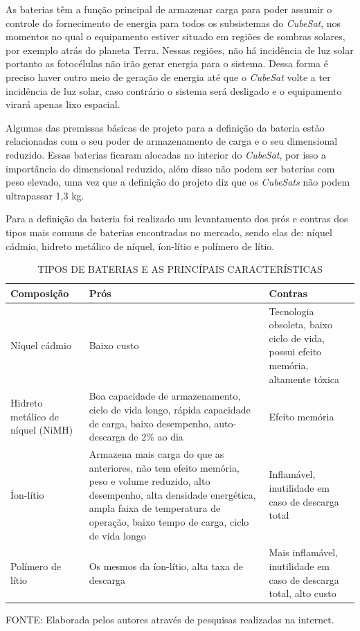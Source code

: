 \documentclass[
	12pt,				%
	openright,			%
	oneside,			%
	a4paper,			%
	english,			%
	french,				%
	spanish,			%
	brazil,				%
	oldfontcommands
	]{abntex2}
\begin{document}
	
	As baterias têm a função principal de armazenar carga para poder assumir o controle do fornecimento de energia para todos os subsistemas do \textit{CubeSat}, nos momentos no qual o equipamento estiver situado em regiões de sombras solares, por exemplo atrás do planeta Terra. Nessas regiões, não há incidência de luz solar portanto as fotocélulas não irão gerar energia para o sistema. Dessa forma é preciso haver outro meio de geração de energia até que o \textit{CubeSat} volte a ter incidência de luz solar, caso contrário o sistema será desligado e o equipamento virará apenas lixo espacial.	
	
	Algumas das premissas básicas de projeto para a definição da bateria estão relacionadas com o seu poder de armazenamento de carga e o seu dimensional reduzido. Essas baterias ficaram alocadas no interior do \textit{CubeSat}, por isso a importância do dimensional reduzido, além disso não podem ser baterias com peso elevado, uma vez que a definição do projeto diz que os \textit{CubeSats} não podem ultrapassar 1,3 kg.
	
	Para a definição da bateria foi realizado um levantamento dos prós e contras dos tipos mais comuns de baterias encontradas no mercado, sendo elas de: níquel cádmio, hidreto metálico de níquel, íon-lítio e polímero de lítio.
		
	\begin{table}[th]
	\caption{TIPOS DE BATERIAS E AS PRINCÍPAIS CARACTERÍSTICAS}
	\begin{tabular}{p{4cm}|p{6cm}|p{5cm}}
	\textbf{Composição} & \textbf{Prós} & \textbf{Contras}\\
	\hline
	Níquel cádmio & Baixo custo & Tecnologia obsoleta, baixo ciclo de vida, possui efeito memória, altamente tóxica\\
	\hline
	Hidreto metálico de níquel (NiMH) &	Boa capacidade de armazenamento, ciclo de vida longo, rápida capacidade de carga, baixo desempenho, auto-descarga de 2\% ao dia & Efeito memória\\
	\hline
	Íon-lítio & Armazena mais carga do que as anteriores, não tem efeito memória, peso e volume reduzido, alto desempenho, alta densidade energética, ampla faixa de temperatura de operação, baixo tempo de carga, ciclo de vida longo & Inflamável, inutilidade em caso de descarga total\\
	\hline
	Polímero de lítio & Os mesmos da íon-lítio, alta taxa de descarga & Mais inflamável, inutilidade em caso de descarga total, alto custo\\	
	\hline
	\end{tabular}
	
	\begin{small}
	\vspace{3pt}
		FONTE: Elaborada pelos autores através de pesquisas realizadas na internet.
	\end{small}
	\end{table}
		
\end{document}
